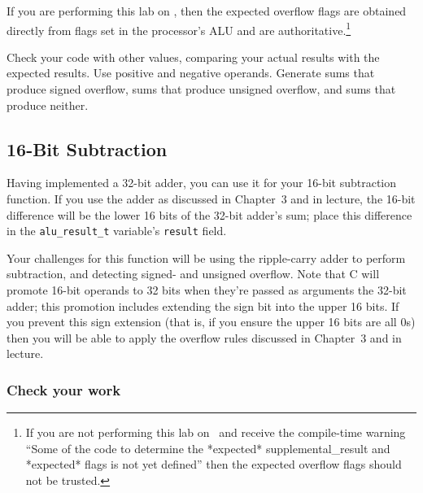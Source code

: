 If you are performing this lab on \runtimeenvironment, then the expected overflow flags are obtained directly from flags set in the processor's ALU and are authoritative.\footnote{
    If you are not performing this lab on \runtimeenvironment\ and receive the compile-time warning ``Some of the code to determine the *expected* supplemental\_result and *expected* flags is not yet defined'' then the expected overflow flags should not be trusted.
}

Check your code with other values, comparing your actual results with the expected results.
Use positive and negative operands.
Generate sums that produce signed overflow, sums that produce unsigned overflow, and sums that produce neither.


\subsection{16-Bit Subtraction}

Having implemented a 32-bit adder, you can use it for your 16-bit subtraction function.
If you use the adder as discussed in Chapter~3 and in lecture, the 16-bit difference will be the lower 16 bits of the 32-bit adder's sum;
place this difference in the \lstinline{alu_result_t} variable's \lstinline{result} field.

Your challenges for this function will be using the ripple-carry adder to perform subtraction, and detecting signed- and unsigned overflow.
Note that C will promote 16-bit operands to 32 bits when they're passed as arguments the 32-bit adder;
this promotion includes extending the sign bit into the upper 16 bits.
If you prevent this sign extension (that is, if you ensure the upper 16 bits are all 0s) then you will be able to apply the overflow rules discussed in Chapter~3 and in lecture.


\subsubsection*{Check your work}

